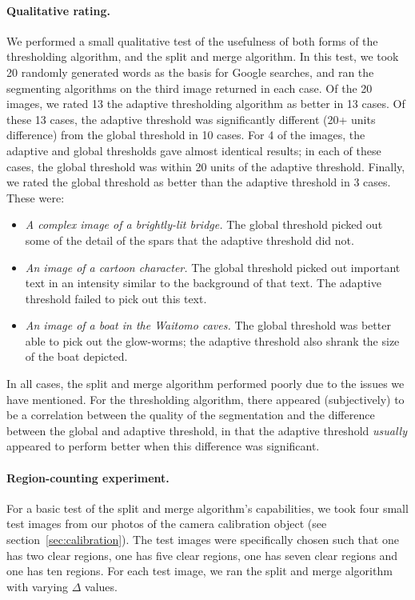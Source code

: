 \paragraph{Qualitative rating.}
We performed a small qualitative test of the usefulness of both forms of the thresholding algorithm, and the split and merge algorithm. In this test, we took 20 randomly generated words as the basis for Google searches, and ran the segmenting algorithms on the third image returned in each case. Of the 20 images, we rated 13 the adaptive thresholding algorithm as better in 13 cases. Of these 13 cases, the adaptive threshold was significantly different (20+ units difference) from the global threshold in 10 cases. For 4 of the images, the adaptive and global thresholds gave almost identical results; in each of these cases, the global threshold was within 20 units of the adaptive threshold. Finally, we rated the global threshold as better than the adaptive threshold in 3 cases. These were:
\begin{itemize}
   \item \emph{A complex image of a brightly-lit bridge.} The global threshold picked out some of the detail of the spars that the adaptive threshold did not.
   \item \emph{An image of a cartoon character.} The global threshold picked out important text in an intensity similar to the background of that text. The adaptive threshold failed to pick out this text.
   \item \emph{An image of a boat in the Waitomo caves.} The global threshold was better able to pick out the glow-worms; the adaptive threshold also shrank the size of the boat depicted.
\end{itemize}
In all cases, the split and merge algorithm performed poorly due to the issues we have mentioned. For the thresholding algorithm, there appeared (subjectively) to be a correlation between the quality of the segmentation and the difference between the global and adaptive threshold, in that the adaptive threshold \emph{usually} appeared to perform better when this difference was significant.

\paragraph{Region-counting experiment.}
For a basic test of the split and merge algorithm's capabilities, we took four small test images from our photos of the camera calibration object (see section~\ref{sec:calibration}). The test images were specifically chosen such that one has two clear regions, one has five clear regions, one has seven clear regions and one has ten regions. For each test image, we ran the split and merge algorithm with varying $\Delta$ values.

